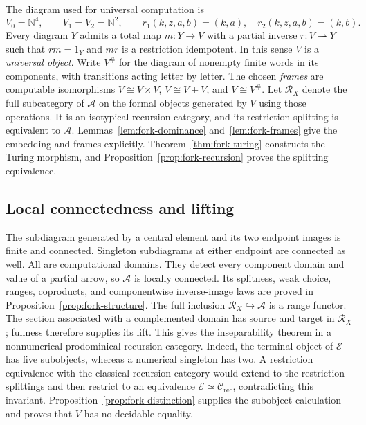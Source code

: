 \documentclass[11pt]{article}
\newcommand{\N}{\mathbb N}
\begin{document}
The diagram used for universal computation is
\begin{equation}\label{eq:universal-fork}
 V_0=\N^4,\qquad V_1=V_2=\N^2,\qquad
 r_1(k,z,a,b)=(k,a),\quad r_2(k,z,a,b)=(k,b).
\end{equation}
Every diagram $Y$ admits a total map $m:Y\to V$ with a partial
inverse $r:V\rightharpoonup Y$ such that $rm=1_Y$ and
$mr$ is a restriction idempotent. In this sense $V$ is a
\emph{universal object}.
Write $V^\#$ for the diagram of nonempty finite words in its
components, with transitions acting letter by letter.
The chosen \emph{frames} are computable isomorphisms
$V\cong V\times V$, $V\cong V+V$, and $V\cong V^\#$.
Let $\mathscr R_X$ denote the full subcategory of $\mathcal A$
on the formal objects generated by $V$ using those operations.
It is an isotypical recursion category, and its restriction
splitting is equivalent to $\mathcal A$.
Lemmas~\ref{lem:fork-dominance} and~\ref{lem:fork-frames} give the
embedding and frames explicitly. Theorem~\ref{thm:fork-turing}
constructs the Turing morphism, and
Proposition~\ref{prop:fork-recursion} proves the splitting equivalence.

\subsection{Local connectedness and lifting}

The subdiagram generated by a central element and its two endpoint
images is finite and connected. Singleton subdiagrams at either endpoint
are connected as well. All are computational domains. They detect every
component domain and value of a partial arrow, so $\mathcal A$ is locally
connected. Its splitness, weak choice, ranges, coproducts, and
componentwise inverse-image laws are proved in
Proposition~\ref{prop:fork-structure}.
The full inclusion $\mathscr R_X\hookrightarrow\mathcal A$ is a
range functor.
The section associated with a complemented domain has source and target
in $\mathscr R_X$; fullness therefore supplies its lift. This gives the
inseparability theorem in a nonnumerical prodominical recursion category.
Indeed, the terminal object of $\mathcal E$ has five subobjects,
whereas a numerical singleton has two.
A restriction equivalence with the classical recursion category
would extend to the restriction splittings and then restrict to an
equivalence $\mathcal E\simeq\mathcal C_{\mathrm{rec}}$, contradicting
this invariant. Proposition~\ref{prop:fork-distinction} supplies the
subobject calculation and proves that $V$ has no decidable equality.
\end{document}
